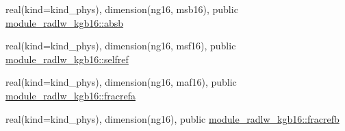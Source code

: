 \begin{DoxyCompactItemize}
real(kind=kind\+\_\+phys), dimension(ng16, msb16), public \hyperlink{namespacemodule__radlw__kgb16_ae856b42252b71d4d588ea5e19e871cac}{module\+\_\+radlw\+\_\+kgb16\+::absb}
\item 
real(kind=kind\+\_\+phys), dimension(ng16, msf16), public \hyperlink{namespacemodule__radlw__kgb16_afaa2554e1161bd6c983ce630d39d703a}{module\+\_\+radlw\+\_\+kgb16\+::selfref}
\item 
real(kind=kind\+\_\+phys), dimension(ng16, maf16), public \hyperlink{namespacemodule__radlw__kgb16_a355dcc9f6f4955ab3d7ee0a22005c8ba}{module\+\_\+radlw\+\_\+kgb16\+::fracrefa}
\item 
real(kind=kind\+\_\+phys), dimension(ng16), public \hyperlink{namespacemodule__radlw__kgb16_ab93affafac8e2bb182982133a6449de4}{module\+\_\+radlw\+\_\+kgb16\+::fracrefb}
\end{DoxyCompactItemize}
